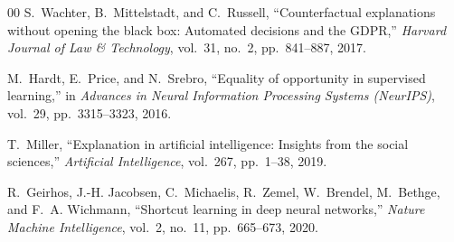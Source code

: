 \documentclass[conference]{IEEEtran}
\begin{document}
\begin{thebibliography}{00}
S.~Wachter, B.~Mittelstadt, and C.~Russell, ``Counterfactual explanations without opening the black box: Automated decisions and the GDPR,'' \emph{Harvard Journal of Law \& Technology}, vol.~31, no.~2, pp.~841--887, 2017.

M.~Hardt, E.~Price, and N.~Srebro, ``Equality of opportunity in supervised learning,'' in \emph{Advances in Neural Information Processing Systems (NeurIPS)}, vol.~29, pp.~3315--3323, 2016.

T.~Miller, ``Explanation in artificial intelligence: Insights from the social sciences,'' \emph{Artificial Intelligence}, vol.~267, pp.~1--38, 2019.

R.~Geirhos, J.-H. Jacobsen, C.~Michaelis, R.~Zemel, W.~Brendel, M.~Bethge, and F.~A. Wichmann, ``Shortcut learning in deep neural networks,'' \emph{Nature Machine Intelligence}, vol.~2, no.~11, pp.~665--673, 2020.

\end{thebibliography}
\end{document}
